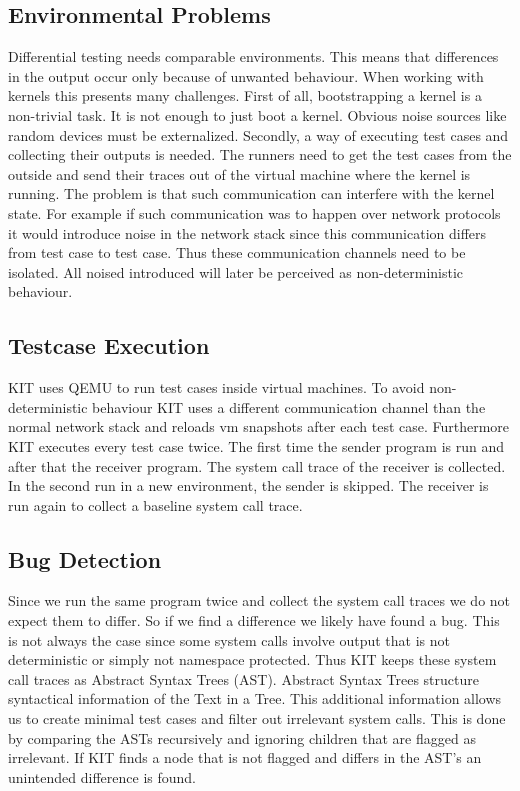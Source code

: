 \documentclass[10pt,twocolumn,a4paper]{article}
\begin{document}
\subsection{Environmental Problems}
Differential testing needs comparable environments. This means that differences in the output
occur only because of unwanted behaviour. When working with kernels this presents many challenges.
First of all, bootstrapping a kernel is a non-trivial task. It is not enough to just boot a kernel. 
Obvious noise sources like random devices must be externalized.
Secondly, a way of executing test cases and collecting their outputs is needed. 
The runners need to get the test cases from the outside and send their traces out of the virtual machine
where the kernel is running.
The problem is that such communication can interfere with the kernel state. For example if such
communication was to happen over network protocols it would introduce noise in the network stack
since this communication differs from test case to test case. 
Thus these communication channels need to be isolated. All noised introduced will later be perceived as
non-deterministic behaviour.

\subsection{Testcase Execution}
KIT uses QEMU to run test cases inside virtual machines.
To avoid non-deterministic behaviour KIT uses a different communication channel than the normal network stack and reloads vm snapshots after
each test case. Furthermore KIT  executes every test case twice.
The first time the sender program is run and after that the receiver program. 
The system call trace of the receiver is collected.
In the second run in a new environment, the sender is skipped. 
The receiver is run again to collect a baseline system call trace\cite{0}. 
\subsection{Bug Detection}
Since we run the same program twice and collect the system call traces we do not expect them to
differ. So if we find a difference we likely have found a bug. This is not always the case since some
system calls involve output that is not deterministic or simply not namespace protected.
Thus KIT keeps these system call traces as Abstract Syntax Trees (AST). 
Abstract Syntax  Trees structure syntactical information of the Text in a Tree.
 This additional information allows 
us to create minimal test cases and filter out irrelevant system calls. 
This is done by comparing the ASTs recursively and ignoring children that are flagged as irrelevant. 
If KIT finds a node that is not flagged and differs in the AST's an unintended difference is found. 
\end{document}
